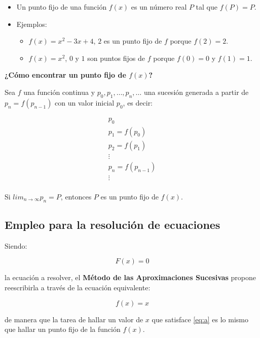 \documentclass[openany]{book}
\providecommand{\tightlist}{%
  \setlength{\itemsep}{0pt}\setlength{\parskip}{0pt}}
\begin{document}
\begin{itemize}
\item
  Un punto fijo de una función \(f(x)\) es un número real \(P\) tal que \(f(P)=P\).
\item
  Ejemplos:

  \begin{itemize}
  \tightlist
  \item
    \(f(x)=x^{2}-3x+4\), \(2\) es un punto fijo de \(f\) porque \(f(2) = 2\).
  \item
    \(f(x)=x^{2}\), \(0\) y \(1\) son puntos fijos de \(f\) porque \(f(0) = 0\) y \(f(1) = 1\).
  \end{itemize}
\end{itemize}

\textbf{¿Cómo encontrar un punto fijo de \(f(x)\)?}

Sea \(f\) una función continua y \(p_0, p_1, \dots, p_n, \dots\) una sucesión generada a partir de \(p_{n} = f(p_{n-1})\) con un valor inicial \(p_0\), es decir:

\begin{gather*}
p_0 \\
p_1 = f(p_0) \\
p_2 = f(p_1) \\
\vdots \\
p_n = f(p_{n-1}) \\
\vdots \\
\end{gather*}

Si \(lim_{n\to\infty} p_n = P\), entonces \(P\) es un punto fijo de \(f(x)\).

\hypertarget{empleo-para-la-resoluciuxf3n-de-ecuaciones}{%
\subsection{Empleo para la resolución de ecuaciones}\label{empleo-para-la-resoluciuxf3n-de-ecuaciones}}

Siendo:

\begin{equation}
\label{eq:a}
F(x) = 0
\end{equation}

la ecuación a resolver, el \textbf{Método de las Aproximaciones Sucesivas} propone reescribirla a través de la ecuación equivalente:

\[
f(x) = x
\]

de manera que la tarea de hallar un valor de \(x\) que satisface \eqref{eq:a} es lo mismo que hallar un punto fijo de la función \(f(x)\).
\end{document}
